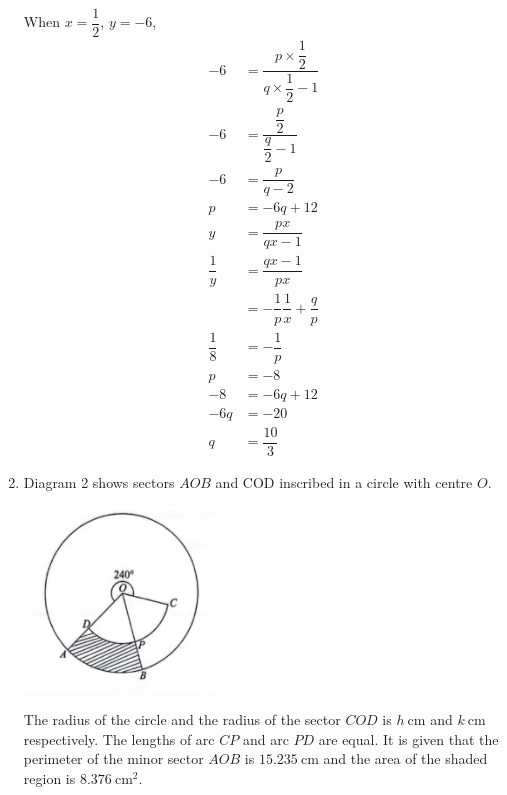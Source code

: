 \documentclass{report}
\begin{document}
\begin{enumerate}[leftmargin=*]
          When $x=\dfrac{1}{2}$, $y=-6$,
          \begin{align*}
              -6           & =\dfrac{p \times \dfrac{1}{2}}{q \times \dfrac{1}{2}-1} \\
              -6           & =\dfrac{\dfrac{p}{2}}{\dfrac{q}{2}-1}                   \\
              -6           & =\dfrac{p}{q-2}                                         \\
              p            & =-6q+12                                                 \\
              y            & =\dfrac{p x}{q x-1}                                     \\
              \dfrac{1}{y} & = \dfrac{q x-1}{p x}                                    \\
                           & = -\dfrac{1}{p}\dfrac{1}{x} + \dfrac{q}{p}              \\
              \dfrac{1}{8} & = -\dfrac{1}{p}                                         \\
              p            & = -8                                                    \\
              -8           & = -6q+12                                                \\
              -6q          & = -20                                                   \\
              q            & = \dfrac{10}{3}
          \end{align*}

    \item Diagram 2 shows sectors $A O B$ and COD inscribed in a circle with centre $O$.
          \begin{center}
              \includegraphics[width=0.4\textwidth]{./assets/p1.7.png}
          \end{center}
          The radius of the circle and the radius of the sector $C O D$ is $h \mathrm{~cm}$ and $k \mathrm{~cm}$ respectively. The lengths of arc $C P$ and arc $P D$ are equal. It is given that the perimeter of the minor sector $A O B$ is $15.235 \mathrm{~cm}$ and the area of the shaded region is $8.376 \mathrm{~cm}^2$.


\end{enumerate}
\end{document}
